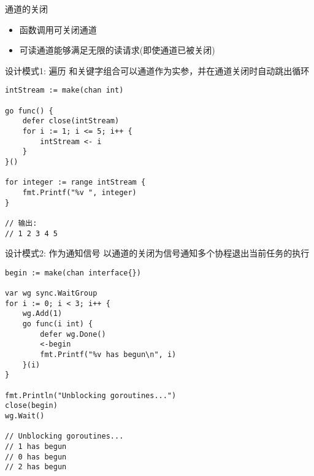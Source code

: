 \begin{frame}{通道的关闭}
    \begin{itemize}
        \item {}函数调用可关闭通道
        \item 可读通道能够满足无限的读请求(即使通道已被关闭)
    \end{itemize}
\end{frame}

\begin{frame}[fragile]{设计模式1: 遍历}
    和关键字组合可以通道作为实参，并在通道关闭时自动跳出循环
\begin{lstlisting}
intStream := make(chan int)

go func() {
    defer close(intStream)
    for i := 1; i <= 5; i++ {
        intStream <- i
    }
}()

for integer := range intStream {
    fmt.Printf("%v ", integer)
}

// 输出:
// 1 2 3 4 5 
\end{lstlisting}    
\end{frame}

\begin{frame}[fragile]{设计模式2: 作为通知信号}
    以通道的关闭为信号通知多个协程退出当前任务的执行
\begin{lstlisting}
begin := make(chan interface{})

var wg sync.WaitGroup
for i := 0; i < 3; i++ {
    wg.Add(1)
    go func(i int) {
        defer wg.Done()
        <-begin
        fmt.Printf("%v has begun\n", i)
    }(i)
}

fmt.Println("Unblocking goroutines...")
close(begin)
wg.Wait()

// Unblocking goroutines...
// 1 has begun
// 0 has begun
// 2 has begun
\end{lstlisting}
\end{frame}

